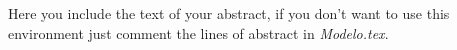 Here you include the text of your abstract, if you don't want to use this environment just comment the lines of abstract in \emph{Modelo.tex}.